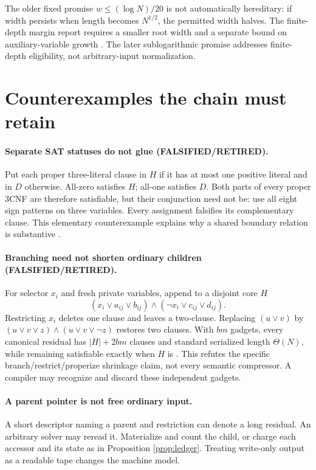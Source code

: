 \documentclass[11pt]{article}
\newcommand{\RET}{\textbf{FALSIFIED/RETIRED}}
\begin{document}
The older fixed promise $w\le(\log N)/20$ is not automatically hereditary:
if width persists when length becomes $N^{1/2}$, the permitted width
halves. The finite-depth margin report requires a smaller root width
and a separate bound on auxiliary-variable growth \cite{width}.
The later sublogarithmic promise addresses finite-depth eligibility,
not arbitrary-input normalization.

\section{Counterexamples the chain must retain}
\paragraph{Separate SAT statuses do not glue (\RET).}
Put each proper three-literal clause in $H$ if it has at most one positive
literal and in $D$ otherwise. All-zero satisfies $H$; all-one satisfies $D$.
Both parts of every proper 3CNF are therefore satisfiable, but their
conjunction need not be: use all eight sign patterns on three variables.
Every assignment falsifies its complementary clause.
This elementary counterexample explains why a shared boundary relation is
substantive \cite{fallback}.

\paragraph{Branching need not shorten ordinary children (\RET).}
For selector $x_i$ and fresh private variables, append to a disjoint core $H$
\[
 (x_i\vee a_{ij}\vee b_{ij})\land
 (\neg x_i\vee c_{ij}\vee d_{ij}).
\]
Restricting $x_i$ deletes one clause and leaves a two-clause.
Replacing $(u\vee v)$ by
$(u\vee v\vee z)\land(u\vee v\vee\neg z)$ restores two clauses.
With $bm$ gadgets, every canonical residual has $|H|+2bm$ clauses
and standard serialized length $\Theta(N)$, while remaining satisfiable
exactly when $H$ is \cite{restriction}. This refutes the specific
branch/restrict/properize shrinkage claim, not every semantic compressor.
A compiler may recognize and discard these independent gadgets.

\paragraph{A parent pointer is not free ordinary input.}
A short descriptor naming a parent and restriction can denote a long
residual. An arbitrary solver may reread it. Materialize and count the child,
or charge each accessor and its state as in Proposition \ref{prop:ledger}.
Treating write-only output as a readable tape changes the machine model.
\end{document}
